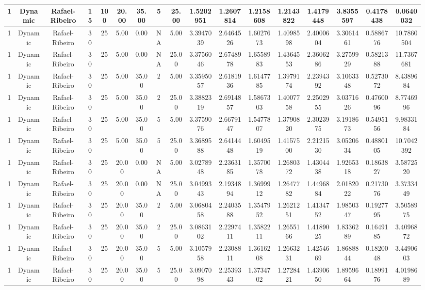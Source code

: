 \begin{longtable}{ | c | c | c | c | c | c | c | c | c | c | c | c | c | c | c | c | c | }
	\hline
	1	&	Dynamic	&	Rafael-Ribeiro	&	15	&	100	&	20.00	&	35.00	&	5	&	25.00	&	1.5202951	&	1.2607814	&	1.2158608	&	1.2143822	&	1.4179448	&	3.8355597	&	0.4178438	&	0.0640032 \\
	\hline
	1	&	Dynamic	&	Rafael-Ribeiro	&	30	&	25	&	5.00	&	0.00	&	NA	&	5.00	&	3.3947039	&	2.6464526	&	1.6027673	&	1.4098598	&	2.4000604	&	3.3061461	&	0.5886776	&	10.7860504 \\
	\hline
	1	&	Dynamic	&	Rafael-Ribeiro	&	30	&	25	&	5.00	&	0.00	&	NA	&	25.00	&	3.3756046	&	2.6748978	&	1.6558983	&	1.4364553	&	2.3606286	&	3.2759929	&	0.5821388	&	11.7367681 \\
	\hline
	1	&	Dynamic	&	Rafael-Ribeiro	&	30	&	25	&	5.00	&	35.00	&	2	&	5.00	&	3.3595057	&	2.6181936	&	1.6147785	&	1.3979174	&	2.2394392	&	3.1063348	&	0.5273072	&	8.4389684 \\
	\hline
	1	&	Dynamic	&	Rafael-Ribeiro	&	30	&	25	&	5.00	&	35.00	&	2	&	25.00	&	3.3882319	&	2.6914857	&	1.5867303	&	1.4007758	&	2.2502955	&	3.0371626	&	0.4760096	&	8.7746996 \\
	\hline
	1	&	Dynamic	&	Rafael-Ribeiro	&	30	&	25	&	5.00	&	35.00	&	5	&	5.00	&	3.3759076	&	2.6679147	&	1.5477807	&	1.3790820	&	2.3023975	&	3.1918673	&	0.5495156	&	9.9833184 \\
	\hline
	1	&	Dynamic	&	Rafael-Ribeiro	&	30	&	25	&	5.00	&	35.00	&	5	&	25.00	&	3.3689588	&	2.6414448	&	1.6049519	&	1.4157500	&	2.2121530	&	3.0520634	&	0.4880105	&	10.7042392 \\
	\hline
	1	&	Dynamic	&	Rafael-Ribeiro	&	30	&	25	&	20.00	&	0.00	&	NA	&	5.00	&	3.0278948	&	2.2363185	&	1.3570078	&	1.2680372	&	1.4304438	&	1.9265318	&	0.1863827	&	3.5872520 \\
	\hline
	1	&	Dynamic	&	Rafael-Ribeiro	&	30	&	25	&	20.00	&	0.00	&	NA	&	25.00	&	3.0499343	&	2.1934894	&	1.3699912	&	1.2647782	&	1.4496884	&	2.0182022	&	0.2173076	&	3.3733449 \\
	\hline
	1	&	Dynamic	&	Rafael-Ribeiro	&	30	&	25	&	20.00	&	35.00	&	2	&	5.00	&	3.0680458	&	2.2403588	&	1.3547952	&	1.2621251	&	1.4134752	&	1.9850347	&	0.1927795	&	3.5058975 \\
	\hline
	1	&	Dynamic	&	Rafael-Ribeiro	&	30	&	25	&	20.00	&	35.00	&	2	&	25.00	&	3.0863102	&	2.2297411	&	1.3582211	&	1.2655166	&	1.4189025	&	1.8336289	&	0.1649185	&	3.4096872 \\
	\hline
	1	&	Dynamic	&	Rafael-Ribeiro	&	30	&	25	&	20.00	&	35.00	&	5	&	5.00	&	3.1057958	&	2.2308811	&	1.3616208	&	1.2663231	&	1.4254669	&	1.8688844	&	0.1820048	&	3.4490603 \\
	\hline
	1	&	Dynamic	&	Rafael-Ribeiro	&	30	&	25	&	20.00	&	35.00	&	5	&	25.00	&	3.0907098	&	2.2539343	&	1.3734702	&	1.2728421	&	1.4390650	&	1.8959664	&	0.1899176	&	4.0198689 \\

\end{longtable}
